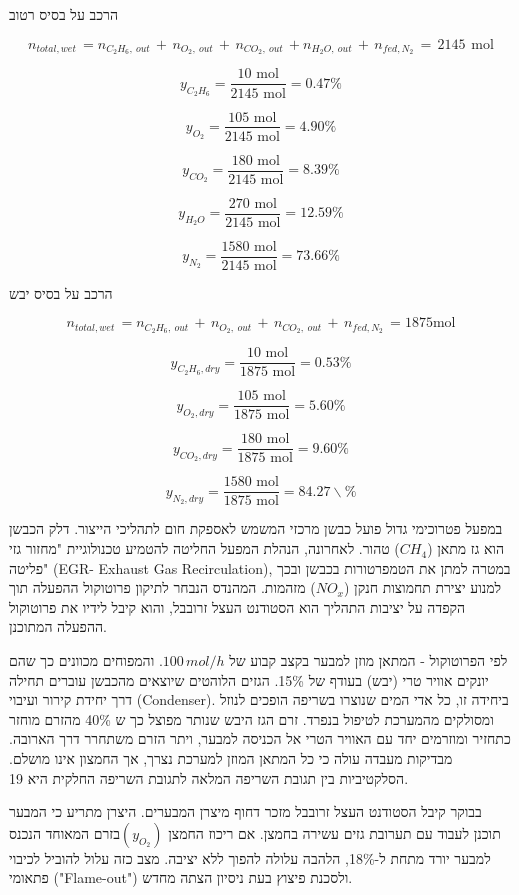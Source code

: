 \documentclass[
  hebrew,
  letterpaper,
  DIV=11,
  numbers=noendperiod]{scrreprt}
\begin{document}
הרכב על בסיס רטוב

\[\, n_{total,wet}\, = n_{C_{2}H_{6},\ out}\, + \, n_{O_{2},\ out}\, + \, n_{{CO}_{2},\ out}\, + n_{H_{2}O,\ out}\, + \, n_{fed,N_{2}}\, = \, 2145\,\text{ mol}\,\]

\[y_{C_{2}H_{6}} = \frac{10\text{ mol}}{2145\text{ mol}} = 0.47\%\]

\[y_{O_{2}} = \frac{105\text{ mol}}{2145\text{ mol}} = 4.90\%\]

\[y_{CO_{2}} = \frac{180\text{ mol}}{2145\text{ mol}} = 8.39\%\]

\[y_{H_{2}O} = \frac{270\text{ mol}}{2145\text{ mol}} = 12.59\%\]

\[y_{N_{2}} = \frac{1580\text{ mol}}{2145\text{ mol}} = 73.66\%\]

הרכב על בסיס יבש

\[n_{total,wet}\, = n_{C_{2}H_{6},\ out}\, + \, n_{O_{2},\ out}\, + \, n_{{CO}_{2},\ out}\, + \, n_{fed,N_{2}}\, = 1875\text{mol}\]

\[y_{C_{2}H_{6},dry} = \frac{10\text{ mol}}{1875\text{ mol}} = 0.53\%\]

\[y_{O_{2},dry} = \frac{105\text{ mol}}{1875\text{ mol}} = 5.60\%\]

\[y_{CO_{2},dry} = \frac{180\text{ mol}}{1875\text{ mol}} = 9.60\%\]

\[y_{N_{2},dry} = \frac{1580\text{ mol}}{1875\text{ mol}} = 84.27\backslash\%\]

במפעל פטרוכימי גדול פועל כבשן מרכזי המשמש לאספקת חום לתהליכי הייצור. דלק
הכבשן הוא גז מתאן (\(CH_{4}\)) טהור. לאחרונה, הנהלת המפעל החליטה להטמיע
טכנולוגיית "מחזור גזי פליטה" (EGR- Exhaust Gas Recirculation), במטרה
למתן את הטמפרטורות בכבשן ובכך למנוע יצירת תחמוצות חנקן (\(NO_{x}\))
מזהמות. המהנדס הנבחר לתיקון פרוטוקול ההפעלה תוך הקפדה על יציבות התהליך
הוא הסטודנט העצל זרובבל, והוא קיבל לידיו את פרוטוקול ההפעלה המתוכנן.

לפי הפרוטוקול - המתאן מוזן למבער בקצב קבוע של \(100\, mol\text{/}h\).
והמפוחים מכוונים כך שהם יונקים אוויר טרי (יבש) בעודף של 15\%. הגזים
הלוהטים שיוצאים מהכבשן עוברים תחילה דרך יחידת קירור ועיבוי (Condenser).
ביחידה זו, כל אדי המים שנוצרו בשריפה הופכים לנוזל ומסולקים מהמערכת
לטיפול בנפרד. זרם הגז היבש שנותר מפוצל כך ש 40\% מהזרם מוחזר כתחזיר
ומוזרמים יחד עם האוויר הטרי אל הכניסה למבער, ויתר הזרם משתחרר דרך
הארובה. מבדיקות מעבדה עולה כי כל המתאן המוזן למערכת נצרך, אך החמצון אינו
מושלם. הסלקטיביות בין תגובת השריפה המלאה לתגובת השריפה החלקית היא 19.

בבוקר קיבל הסטודנט העצל זרובבל מזכר דחוף מיצרן המבערים. היצרן מתריע כי
המבער תוכנן לעבוד עם תערובת גזים עשירה בחמצן. אם ריכוז החמצן
\(\left( y_{O_{2}} \right)\)בזרם המאוחד הנכנס למבער יורד מתחת ל-18\%,
הלהבה עלולה להפוך ללא יציבה. מצב כזה עלול להוביל לכיבוי פתאומי
("Flame-out") ולסכנת פיצוץ בעת ניסיון הצתה מחדש.
\end{document}
